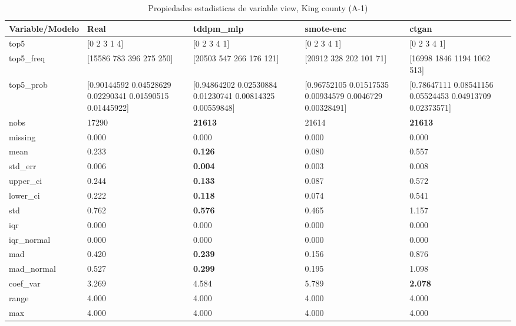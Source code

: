 \begin{table}[H]
\centering
\fontsize{8}{14}\selectfont
\caption{Propiedades  estadisticas de variable view, King county (A-1)}
\label{table-stats-king county-a-1-view}
\begin{tabular}{|l|m{10em}|m{10em}|m{10em}|m{10em}|}
\hline
 \rowcolor[gray]{0.8}
Variable/Modelo & Real & tddpm\_mlp & smote-enc & ctgan \\
\hline top5 & [0 2 3 1 4] & [0 2 3 4 1] & [0 2 3 4 1] & [0 2 3 4 1] \\
\hline top5\_freq & [15586   783   396   275   250] & [20503   547   266   176   121] & [20912   328   202   101    71] & [16998  1846  1194  1062   513] \\
\hline top5\_prob & [0.90144592 0.04528629 0.02290341 0.01590515 0.01445922] & [0.94864202 0.02530884 0.01230741 0.00814325 0.00559848] & [0.96752105 0.01517535 0.00934579 0.0046729  0.00328491] & [0.78647111 0.08541156 0.05524453 0.04913709 0.02373571] \\
\hline nobs & 17290 & \bfseries 21613 & \cellcolor[rgb]{0.9, 0.54, 0.52} 21614 & \bfseries 21613 \\
\hline missing & 0.000 & 0.000 & 0.000 & 0.000 \\
\hline mean & 0.233 & \bfseries 0.126 & 0.080 & \cellcolor[rgb]{0.9, 0.54, 0.52} 0.557 \\
\hline std\_err & 0.006 & \bfseries 0.004 & \cellcolor[rgb]{0.9, 0.54, 0.52} 0.003 & 0.008 \\
\hline upper\_ci & 0.244 & \bfseries 0.133 & 0.087 & \cellcolor[rgb]{0.9, 0.54, 0.52} 0.572 \\
\hline lower\_ci & 0.222 & \bfseries 0.118 & 0.074 & \cellcolor[rgb]{0.9, 0.54, 0.52} 0.541 \\
\hline std & 0.762 & \bfseries 0.576 & 0.465 & \cellcolor[rgb]{0.9, 0.54, 0.52} 1.157 \\
\hline iqr & 0.000 & 0.000 & 0.000 & 0.000 \\
\hline iqr\_normal & 0.000 & 0.000 & 0.000 & 0.000 \\
\hline mad & 0.420 & \bfseries 0.239 & 0.156 & \cellcolor[rgb]{0.9, 0.54, 0.52} 0.876 \\
\hline mad\_normal & 0.527 & \bfseries 0.299 & 0.195 & \cellcolor[rgb]{0.9, 0.54, 0.52} 1.098 \\
\hline coef\_var & 3.269 & 4.584 & \cellcolor[rgb]{0.9, 0.54, 0.52} 5.789 & \bfseries 2.078 \\
\hline range & 4.000 & 4.000 & 4.000 & 4.000 \\
\hline max & 4.000 & 4.000 & 4.000 & 4.000 \\

\end{tabular}
\end{table}
